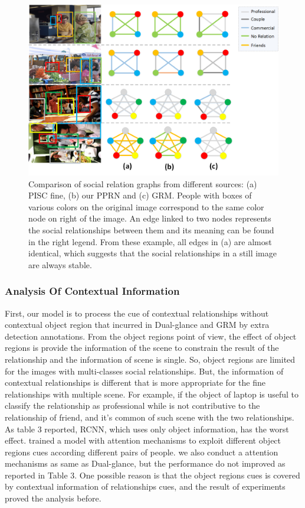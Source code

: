 \documentclass{article}
\newcommand{\PPRN}{{\sf PPRN}}
\begin{document}
\begin{figure}[ht]
  \centering
  \includegraphics[width=0.9\linewidth]{pic/case_study_pisc_fine_union.png}
  \caption{Comparison of social relation graphs from different sources: (a) PISC fine, (b) our {\PPRN}  and (c) GRM. People with boxes of various colors on the original image correspond to the same color node on right of the image. An edge linked to two nodes represents the social relationships between them and its meaning can be found in the right legend. From these example, all edges in (a) are almost identical, which suggests that the social relationships in a still image are always stable.}
  \label{fig:case_study}
\end{figure}

\subsubsection{Analysis Of Contextual Information}

First, our model is to process the cue of contextual relationships without contextual object region that incurred in Dual-glance and GRM by extra detection annotations.
From the object regions point of view, the effect of object regions is provide the information of the scene to constrain the result of the relationship and the information of scene is single. So, object regions are limited for the images with multi-classes social relationships. But, the information of contextual relationships is different that is more appropriate for the fine relationships with multiple scene.
For example, if the object of laptop is useful to classify the relationship as professional while is not contributive to the relationship of friend, and it's common of such scene with the two relationships.
As table 3 reported, RCNN, which uses only object information, has the worst effect. \cite{DBLP:conf/iccv/LiWZK17} trained a model with attention mechanisms to exploit different object regions cues according different pairs of people. we also conduct a attention mechanisms as same as Dual-glance, but the performance do not improved as reported in Table 3.
One possible reason is that the object regions cues is covered by contextual information of relationships cues, and the result of experiments proved the analysis before.
\end{document}
